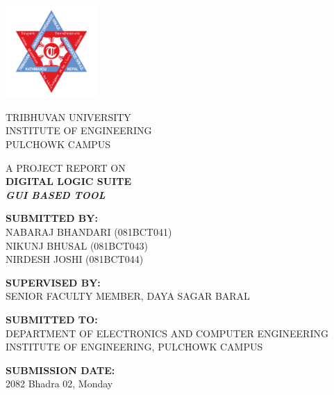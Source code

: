 \begin{titlepage}
    \begin{center}
        \includegraphics[width=3.5cm]{images/tuLogo.png}
        \vspace{0.8cm}

        {\large TRIBHUVAN UNIVERSITY} \\
        {\normalsize INSTITUTE OF ENGINEERING} \\
        {\normalsize PULCHOWK CAMPUS}
        \vspace{1cm}

        {\large A PROJECT REPORT ON} \\
        \vspace{0.4cm}
        {\LARGE \textbf{DIGITAL LOGIC SUITE}} \\
        \vspace{0.2cm}
        {\normalsize \textit{\textbf{GUI BASED TOOL}}}
        \vspace{1cm}

        {\normalsize \textbf{SUBMITTED BY:}} \\
        \vspace{0.2cm}
        {\normalsize NABARAJ BHANDARI (081BCT041)} \\
        {\normalsize NIKUNJ BHUSAL (081BCT043)} \\
        {\normalsize NIRDESH JOSHI (081BCT044)}
        \vspace{0.8cm}

        {\normalsize \textbf{SUPERVISED BY:}} \\
        \vspace{0.2cm}
        {\normalsize SENIOR FACULTY MEMBER, DAYA SAGAR BARAL}
        \vspace{0.8cm}

        {\normalsize \textbf{SUBMITTED TO:}} \\
        \vspace{0.2cm}
        {\normalsize DEPARTMENT OF ELECTRONICS AND COMPUTER ENGINEERING} \\
        {\normalsize INSTITUTE OF ENGINEERING, PULCHOWK CAMPUS}
        \vspace{1cm}

        {\normalsize \textbf{SUBMISSION DATE:}} \\
        \vspace{0.2cm}
        {\normalsize 2082 Bhadra 02, Monday}
    \end{center}
\end{titlepage}